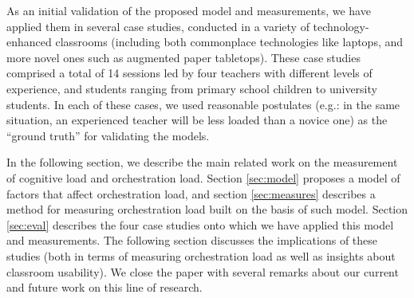 \documentclass[10pt,journal,compsoc]{IEEEtran}
\begin{document}
As an initial validation of the proposed model and measurements, we have applied them in several case studies, conducted in a variety of technology-enhanced classrooms (including both commonplace technologies like laptops, and more novel ones such as augmented paper tabletops). These case studies comprised a total of 14 sessions led by four teachers with different levels of experience, and students ranging from primary school children to university students. In each of these cases, we used reasonable postulates (e.g.: in the same situation, an experienced teacher will be less loaded than a novice one) as the ``ground truth'' for validating the models.

In the following section, we describe the main related work on the measurement of cognitive load and orchestration load. Section \ref{sec:model} proposes a model of factors that affect orchestration load, and section \ref{sec:measures} describes a method for measuring orchestration load built on the basis of such model. Section \ref{sec:eval} describes the four case studies onto which we have applied this model and measurements. The following section discusses the implications of these studies (both in terms of measuring orchestration load as well as insights about classroom usability). We close the paper with several remarks about our current and future work on this line of research.
\end{document}
